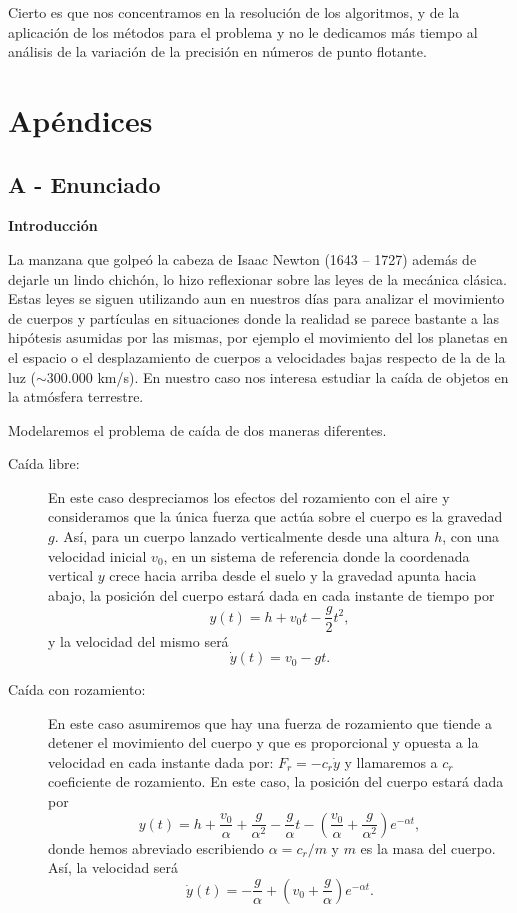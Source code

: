 \documentclass[a4paper]{article}
\begin{document}
Cierto es que nos concentramos en la resolución de los algoritmos, y de la aplicación de los métodos para el problema y no le dedicamos más tiempo al análisis de la variación de la precisión en números de punto flotante.

\newpage

\section{Apéndices}
\subsection{A - Enunciado}
{\bf Introducción}

La manzana que golpeó la cabeza de Isaac Newton (1643 -- 1727) además de dejarle un lindo chichón, lo hizo reflexionar sobre las leyes de la mecánica clásica. Estas leyes se siguen utilizando aun en nuestros días para analizar el movimiento de cuerpos y partículas en situaciones donde la realidad se parece bastante a las hipótesis asumidas por las mismas, por ejemplo el movimiento del los planetas en el espacio o el desplazamiento de cuerpos a velocidades bajas respecto de la de la luz ($\sim 300.000$ km/s). En nuestro caso nos interesa estudiar la caída de objetos en la atmósfera terrestre.

Modelaremos el problema de caída de dos maneras diferentes. 
\begin{description}
 \item[Caída libre:] En este caso despreciamos los efectos del rozamiento con el aire y consideramos que la única fuerza que actúa sobre el cuerpo es la gravedad $g$. Así, para un cuerpo lanzado verticalmente desde una altura $h$, con una velocidad inicial $v_0$, en un sistema de referencia donde la coordenada vertical $y$ crece hacia arriba desde el suelo y la gravedad apunta hacia abajo, la posición del cuerpo estará dada en cada instante de tiempo por
\begin{equation}
 y(t) = h + v_0 t - \frac{g}{2} t^2,
\end{equation}
y la velocidad del mismo será
\begin{equation}
 \dot{y}(t) = v_0 - g t.
\end{equation}
 \item[Caída con rozamiento: ] En este caso asumiremos que hay una fuerza de rozamiento que tiende a detener el movimiento del cuerpo y que es proporcional y opuesta a la velocidad en cada instante dada por: $F_r = - c_r \dot{y}$ y llamaremos a $c_r$ coeficiente de rozamiento. En este caso, la posición del cuerpo estará dada por
\begin{equation}
 y(t) = h + \frac{v_0}{\alpha} + \frac{g}{\alpha^2} - \frac{g}{\alpha} t -\left( \frac{v_0}{\alpha} + \frac{g}{\alpha^2} \right) e^{-\alpha t},
\end{equation}
donde hemos abreviado escribiendo $\alpha = c_r / m$ y $m$ es la masa del cuerpo. Así, la velocidad será 
\begin{equation}
 \dot{y}(t) = - \frac{g}{\alpha} +\left( v_0 + \frac{g}{\alpha} \right) e^{-\alpha t}.
\end{equation}
\end{description}
\end{document}
